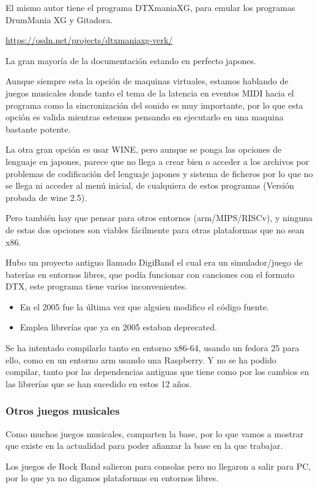 \documentclass[a4paper,11pt,oneside]{book}
\begin{document}
El mismo autor tiene el programa DTXmaniaXG, para emular los programas DrumMania XG y Gitadora.

\url{https://osdn.net/projects/dtxmaniaxg-verk/}

La gran mayoría de la documentación estando en perfecto japones.

Aunque siempre esta la opción de maquinas virtuales, estamos hablando de juegos musicales donde tanto el tema de la latencia en eventos MIDI hacia el programa como la sincronización del sonido es muy importante, por lo que esta opción es valida mientras estemos pensando en ejecutarlo en una maquina bastante potente.

La otra gran opción es usar WINE, pero aunque se ponga las opciones de lenguaje en japones, parece que no llega a crear bien o acceder a los archivos por problemas de codificación del lenguaje japones y sistema de ficheros por lo que no se llega ni acceder al menú inicial, de cualquiera de estos programas  (Versión probada de wine 2.5).

Pero también hay que pensar para otros entornos (arm/MIPS/RISCv), y ninguna de estas dos opciones son viables fácilmente para otras plataformas que no sean x86.

Hubo un proyecto antiguo llamado DigiBand el cual era un simulador/juego de baterías en entornos libres, que podía funcionar con canciones con el formato DTX, este programa tiene varios inconvenientes.
\begin{itemize}
  \item En el 2005 fue la última vez que alguien modifico el código fuente.
  \item Emplea librerías que ya en 2005 estaban deprecated.
\end{itemize}

Se ha intentado compilarlo tanto en entorno x86-64, usando un fedora 25 para ello, como en un entorno arm usando una Raspberry. Y no se ha podido compilar, tanto por las dependencias antiguas que tiene como por los cambios en las librerías que se han sucedido en estos 12 años.

\subsubsection{Otros juegos musicales}

Como muchos juegos musicales, comparten la base, por lo que vamos a mostrar que existe en la actualidad para poder afianzar la base en la que trabajar.


Los juegos de \gls{Rock Band} salieron para consolas pero no llegaron a salir para PC, por lo que  ya no digamos plataformas en entornos libres.
\end{document}

